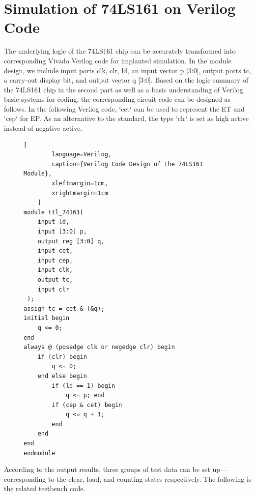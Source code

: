 \documentclass[conference]{IEEEtran}
\begin{document}
\section{Simulation of 74LS161 on Verilog Code}
The underlying logic of the 74LS161 chip can be accurately transformed into corresponding Vivado Verilog code for implanted simulation. In the module design, we include input ports clk, clr, ld, an input vector p [3:0], output ports tc, a carry-out display bit, and output vector q [3:0]. Based on the logic summary of the 74LS161 chip in the second part as well as a basic understanding of Verilog basic systems for coding, the corresponding circuit code can be designed as follows. In the following Verilog code, `cet` can be used to represent the ET and `cep` for EP. As an alternative to the standard, the type `clr` is set as high active instead of negative active.

\begin{figure}[h]
    \centering
    \begin{lstlisting}[
        language=Verilog,
        caption={Verilog Code Design of the 74LS161 Module},
        xleftmargin=1cm,
        xrightmargin=1cm
    ]
module ttl_74161(
    input ld,
    input [3:0] p,
    output reg [3:0] q,
    input cet,
    input cep,
    input clk,
    output tc,
    input clr
 );
assign tc = cet & (&q);
initial begin
    q <= 0;
end
always @ (posedge clk or negedge clr) begin
    if (clr) begin
        q <= 0;
    end else begin
        if (ld == 1) begin
            q <= p; end
        if (cep & cet) begin
            q <= q + 1;
        end  
    end   
end
endmodule
    \end{lstlisting}
\end{figure}


According to the output results, three groups of test data can be set up—corresponding to the clear, load, and counting states respectively. The following is the related testbench code.
\end{document}
